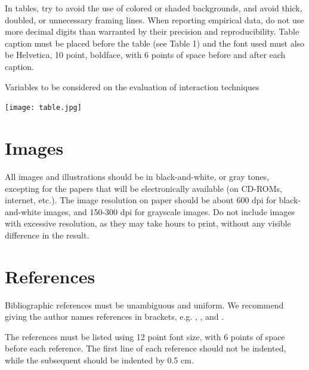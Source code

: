 \documentclass[12pt]{article}
\begin{document}
In tables, try to avoid the use of colored or shaded backgrounds, and avoid
thick, doubled, or unnecessary framing lines. When reporting empirical data,
do not use more decimal digits than warranted by their precision and
reproducibility. Table caption must be placed before the table (see Table 1)
and the font used must also be Helvetica, 10 point, boldface, with 6 points of
space before and after each caption.

\begin{table}[ht]
\centering
\caption{Variables to be considered on the evaluation of interaction
  techniques}
\label{tab:exTable1}
\texttt{[image: table.jpg]}
\end{table}

\section{Images}

All images and illustrations should be in black-and-white, or gray tones,
excepting for the papers that will be electronically available (on CD-ROMs,
internet, etc.). The image resolution on paper should be about 600 dpi for
black-and-white images, and 150-300 dpi for grayscale images.  Do not include
images with excessive resolution, as they may take hours to print, without any
visible difference in the result. 

\section{References}

Bibliographic references must be unambiguous and uniform.  We recommend giving
the author names references in brackets, e.g. \cite{knuth:84},
\cite{boulic:91}, and \cite{smith:99}.

The references must be listed using 12 point font size, with 6 points of space
before each reference. The first line of each reference should not be
indented, while the subsequent should be indented by 0.5 cm.



\end{document}
